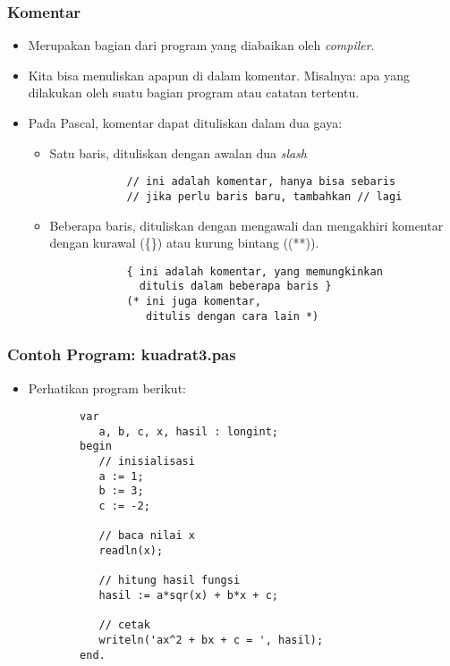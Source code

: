 \documentclass{beamer}
\begin{document}
\begin{frame}[fragile]
\frametitle{Komentar}
\begin{itemize}
    \item Merupakan bagian dari program yang diabaikan oleh \textit{compiler}.
    \item Kita bisa menuliskan apapun di dalam komentar. Misalnya: apa yang dilakukan oleh suatu bagian program atau catatan tertentu.
    \item Pada Pascal, komentar dapat dituliskan dalam dua gaya:
    \begin{itemize}
        \item Satu baris, dituliskan dengan awalan dua \textit{slash}
        \begin{lstlisting}
            // ini adalah komentar, hanya bisa sebaris
            // jika perlu baris baru, tambahkan // lagi
        \end{lstlisting}
        \item Beberapa baris, dituliskan dengan mengawali dan mengakhiri komentar dengan kurawal (\{\}) atau kurung bintang ((**)).
        \begin{lstlisting}
            { ini adalah komentar, yang memungkinkan
              ditulis dalam beberapa baris }
            (* ini juga komentar,
               ditulis dengan cara lain *)
        \end{lstlisting}
    \end{itemize}
\end{itemize}
\end{frame}

\begin{frame} [fragile]
\frametitle{Contoh Program: kuadrat3.pas}
\begin{itemize}
    \item Perhatikan program berikut:
    \begin{lstlisting}
        var
           a, b, c, x, hasil : longint;
        begin
           // inisialisasi
           a := 1;
           b := 3;
           c := -2;

           // baca nilai x
           readln(x);

           // hitung hasil fungsi
           hasil := a*sqr(x) + b*x + c;

           // cetak
           writeln('ax^2 + bx + c = ', hasil);
        end.
    \end{lstlisting}
\end{itemize}
\end{frame}
\end{document}
